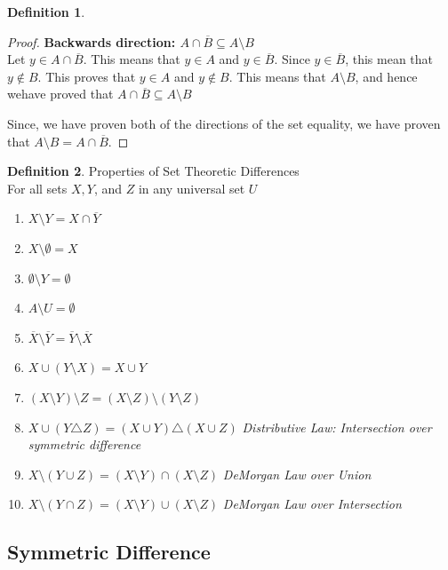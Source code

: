 \documentclass{book}
\theoremstyle{definition}
\newtheorem{definition}{Definition}[section]
\theoremstyle{remark}
\begin{document}
\begin{definition}
\begin{proof}
        \textbf{Backwards direction: $A \cap \overline{B} \subseteq A \setminus B$} \\
            Let $y \in A \cap \overline{B}$. This means that $y \in A$ and $y \in \overline{B}$. Since $y \in \overline{B}$, this mean that $y \notin B$. This proves that $y \in A$ and $y \notin B$. This means that $A \setminus B$, and hence wehave proved that $A \cap \overline{B} \subseteq A \setminus B$
        
        Since, we have proven both of the directions of the set equality, we have proven that $A \setminus B = A \cap \overline{B}$. 
    \end{proof}


\end{definition}



\begin{definition}
Properties of Set Theoretic Differences \\

For all sets $X, Y$, and $Z$ in any universal set $U$ \\

    \begin{enumerate}
        \item $X \setminus Y = X \cap \overline{Y}$
        \item $X \setminus \emptyset = X$
        \item $\emptyset \setminus Y = \emptyset$
        \item $A \setminus U = \emptyset$
        \item $\overline{X} \setminus \overline{Y} = \overline{Y} \setminus \overline{X}$
        \item $X \cup (Y \setminus X) = X \cup Y$    
        \item $(X \setminus Y) \setminus Z = (X \setminus Z) \setminus (Y \setminus Z)$
        \item $X \cup (Y \triangle Z) = (X \cup Y) \triangle (X \cup Z)$ \textit{Distributive Law: Intersection over symmetric difference}
        \item $X \setminus (Y \cup Z) = (X \setminus Y) \cap (X \setminus Z)$ \textit{DeMorgan Law over Union}
        \item $X \setminus (Y \cap Z) = (X \setminus Y) \cup (X \setminus Z)$ \textit{DeMorgan Law over Intersection}
    \end{enumerate}
\end{definition}


\newpage
\subsection{Symmetric Difference}
\end{document}
